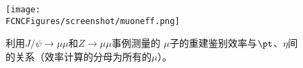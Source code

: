 \begin{figure}[H]
\centering
\texttt{[image: \\FCNCFigures/screenshot/muoneff.png]}
\caption{利用$J/\psi\to\mu\mu$和$Z\to\mu\mu$事例测量的 $\mu$子的重建鉴别效率与$\pt$、$\eta$间的关系（效率计算的分母为所有的$\mu$）。}
\label{fig:muoneff}
\end{figure}